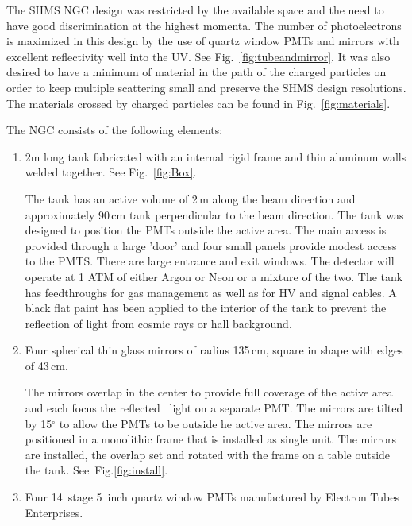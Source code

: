 {The SHMS NGC design was restricted by the available space and the need
to have good discrimination at the highest momenta.  The number of
photoelectrons is maximized in this design by the use of quartz window
PMTs and mirrors with excellent reflectivity well into the UV. See
Fig.~\ref{fig:tubeandmirror}. It was also desired to have a minimum of
material in the path of the charged particles on order to keep
multiple scattering small and preserve the SHMS design
resolutions. The materials crossed by charged particles can be found
in Fig.~\ref{fig:materials}.

\newpage
\vspace{.25in}
\vspace{.25in}

The NGC consists of the following elements:
\begin{enumerate}
\item 2m long tank fabricated with an internal rigid frame and thin
  aluminum walls welded together. See Fig.~\ref{fig:Box}.

 The tank has an active volume of 2\,m along the beam direction and
 approximately 90\,cm tank perpendicular to the beam direction. The
 tank was designed to position the PMTs outside the active area. The
 main access is provided through a large 'door' and four small panels
 provide modest access to the PMTS. There are large entrance and exit
 windows. The detector will operate at 1 ATM of either Argon or Neon
 or a mixture of the two. The tank has feedthroughs for gas
 management as well as for HV and signal cables. A black flat paint
 has been applied to the interior of the tank to prevent the
 reflection of light from cosmic rays or hall background.

\item Four spherical thin glass mirrors of radius 135\,cm, square in
  shape with edges of 43\,cm.

  The mirrors overlap in the center to provide full coverage of the
  active area and each focus the reflected \Cerenkov\ light on a
  separate PMT. The mirrors are tilted by 15$^\circ$ to allow the PMTs
  to be outside he active area.  The mirrors are positioned in a
  monolithic frame that is installed as single unit. The mirrors are
  installed, the overlap set and rotated with the frame on a table
  outside the tank.  See~Fig.\ref{fig:install}.
\item Four 14~stage 5~inch quartz window PMTs manufactured by Electron
  Tubes Enterprises.


\end{enumerate}}
